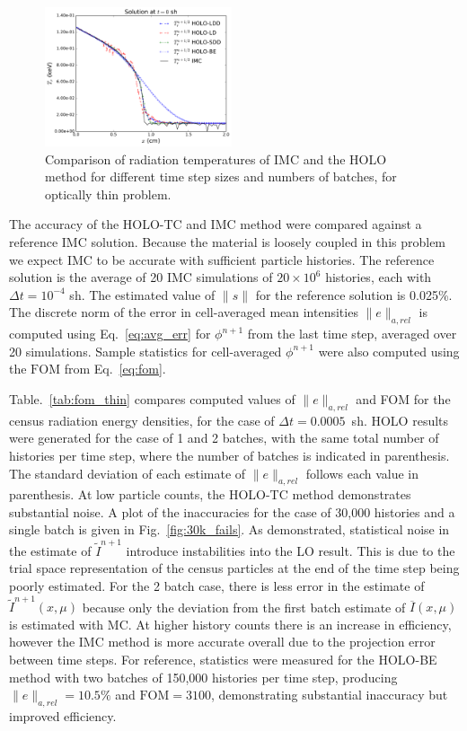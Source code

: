 \documentclass{anstrans}
\newcommand{\FOM}{\ensuremath{\text{FOM}}}
\renewcommand{\ss}{\ensuremath{\|s\|}}
\begin{document}
\begin{figure}[h!]
  \centering
    \includegraphics[width=0.49\textwidth]{thin_temp_compare.pdf}
    \caption{\label{fig:thin_temp_compare} Comparison of radiation temperatures of IMC and
    the HOLO method for different time step sizes and numbers of batches, for optically
thin problem. }
\end{figure}

The accuracy of the HOLO-TC and IMC method were compared against a reference IMC solution.
Because the material is loosely coupled in this problem we expect IMC to be accurate with sufficient particle
histories.  The
reference solution is the average of 20 IMC simulations of $20\times10^6$
histories, each with $\Delta t =10^{-4}$ sh.  The estimated value of $\ss$ for the
reference solution is 0.025\%.  The discrete norm of the error in cell-averaged mean
intensities $\|e\|_{a,rel}$ is computed using Eq.~\eqref{eq:avg_err} for $\phi^{n+1}$ from the last time
step, averaged over 20 simulations.  Sample statistics for cell-averaged $\phi^{n+1}$ were also computed using the $\FOM$
from Eq.~\eqref{eq:fom}.

Table.~\ref{tab:fom_thin} compares computed values of $\|e\|_{a,rel}$ and FOM for the census
radiation energy densities, for the case of $\Delta t =0.0005$~sh.   HOLO results were generated for the case of 1 and 2 batches, with the same
total number of histories per time step, where the number of batches is indicated in
parenthesis. The standard deviation of each estimate of $\|e\|_{a,rel}$ follows each value in parenthesis. 
At low particle counts, the HOLO-TC method demonstrates substantial noise.   
A plot
of the inaccuracies for the case of 30,000 histories and a single batch is given in
Fig.~\ref{fig:30k_fails}.  As demonstrated, statistical noise in the estimate of
$\tilde I^{n+1}$ introduce instabilities into the LO result.
This is due to the trial space representation of the
census particles at the end of the time step being poorly estimated.  For the 2 batch
case, there is less error in the estimate of $\tilde I^{n+1}(x,\mu)$ because only the
deviation from the first batch estimate of $\overline I(x,\mu)$ is estimated with MC. 
At higher history counts there is an increase in efficiency, however the IMC method is
more accurate overall due to the projection error between time steps.  For reference, statistics were measured for the HOLO-BE method with two batches of 150,000
histories per time step, producing $\|e\|_{a,rel}=10.5\%$ and $\FOM=3100$, demonstrating
substantial inaccuracy but improved efficiency.
\end{document}
